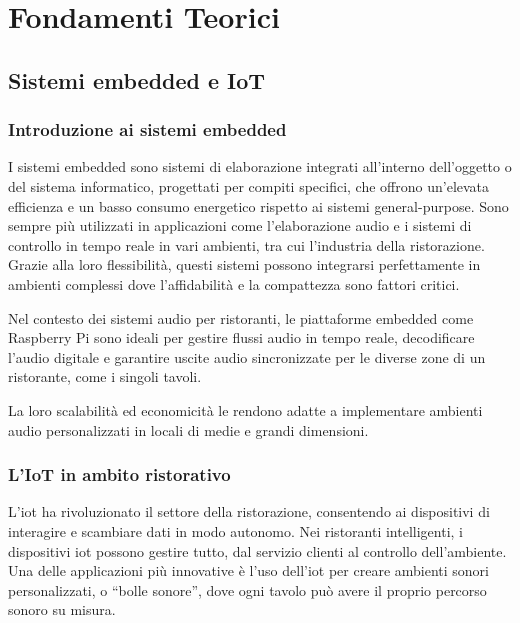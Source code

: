 
%

\chapter{Fondamenti Teorici}


\section{Sistemi embedded e IoT}

\subsection{Introduzione ai sistemi embedded}
\noindent

I sistemi embedded sono sistemi di elaborazione integrati all'interno dell'oggetto o del sistema informatico, progettati per compiti specifici, che offrono un'elevata efficienza e un basso consumo energetico rispetto ai sistemi general-purpose. Sono sempre più utilizzati in applicazioni come l'elaborazione audio e i sistemi di controllo in tempo reale in vari ambienti, tra cui l'industria della ristorazione. Grazie alla loro flessibilità, questi sistemi possono integrarsi perfettamente in ambienti complessi dove l'affidabilità e la compattezza sono fattori critici.

Nel contesto dei sistemi audio per ristoranti, le piattaforme embedded come Raspberry Pi sono ideali per gestire flussi audio in tempo reale, decodificare l'audio digitale e garantire uscite audio sincronizzate per le diverse zone di un ristorante, come i singoli tavoli.

La loro scalabilità ed economicità le rendono adatte a implementare ambienti audio personalizzati in locali di medie e grandi dimensioni.


\subsection{L'IoT in ambito ristorativo}
\noindent

L'\gls{iot} ha rivoluzionato il settore della ristorazione, consentendo ai dispositivi di interagire e scambiare dati in modo autonomo. Nei ristoranti intelligenti, i dispositivi \gls{iot} possono gestire tutto, dal servizio clienti al controllo dell'ambiente. Una delle applicazioni più innovative è l'uso dell'\gls{iot} per creare ambienti sonori personalizzati, o “bolle sonore”, dove ogni tavolo può avere il proprio percorso sonoro su misura.

